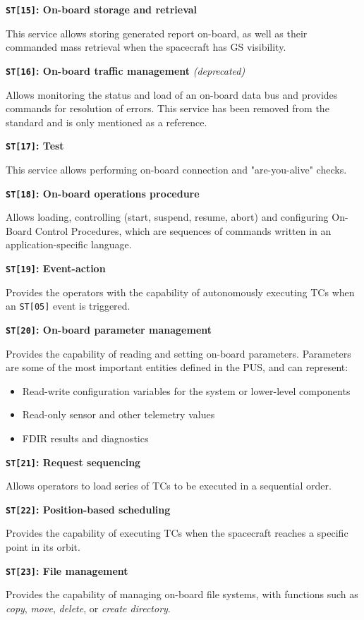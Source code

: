 \documentclass[a4paper,nobib]{tufte-book}
\begin{document}
\begin{compactitem}
	\item \textbf{\texttt{ST[15]}: On-board storage and retrieval}
	
	This service allows storing generated report on-board, as well as their commanded mass retrieval when the spacecraft has \acl{GS} visibility.
	
	\item \textbf{\texttt{ST[16]}: On-board traffic management} \emph{(deprecated)}
	
	Allows monitoring the status and load of an on-board data bus and provides commands for resolution of errors. This service has been removed from the standard and is only mentioned as a reference.
	
	\item \textbf{\texttt{ST[17]}: Test}
	
	This service allows performing on-board connection and "are-you-alive" checks.
	
	\item \textbf{\texttt{ST[18]}: On-board operations procedure}
	
	Allows loading, controlling (start, suspend, resume, abort) and configuring On-Board Control Procedures, which are sequences of commands written in an application-specific language.
	
	\item \textbf{\texttt{ST[19]}: Event-action}
	
	Provides the operators with the capability of autonomously executing \acp{TC} when an \texttt{ST[05]} event is triggered.
	
	\item \textbf{\texttt{ST[20]}: On-board parameter management}
	
	Provides the capability of reading and setting on-board parameters. Parameters are some of the most important entities defined in the \acs{PUS}, and can represent:
	\begin{itemize}
		\item Read-write configuration variables for the system or lower-level components
		\item Read-only sensor and other telemetry values
		\item \ac{FDIR} results and diagnostics
	\end{itemize}
	
	\item \textbf{\texttt{ST[21]}: Request sequencing}
	
	Allows operators to load series of \acp{TC} to be executed in a sequential order.
	
	\item \textbf{\texttt{ST[22]}: Position-based scheduling}
	
	Provides the capability of executing \acp{TC} when the spacecraft reaches a specific point in its orbit.
	
	\item \textbf{\texttt{ST[23]}: File management}
	
	Provides the capability of managing on-board file systems, with functions such as \emph{copy}, \emph{move}, \emph{delete}, or \emph{create directory}.
\end{compactitem}
\end{document}
